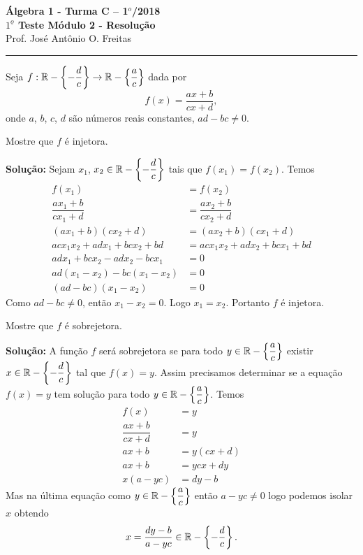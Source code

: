 \documentclass[12pt]{article}
\begin{document}


\begin{center}
{\Large\bf {\'A}lgebra 1 - Turma C -- 1$^{o}$/2018} \\ \vspace{9pt} {\large\bf
  $1^{\underline{o}}$ Teste M\'odulo 2 - Resolu\c{c}\~ao}\\
\vspace{9pt} Prof. Jos{\'e} Ant{\^o}nio O. Freitas
\end{center}
\hrule

\vspace{.6cm}

Seja $f : \mathbb{R} - \left\{-\dfrac{d}{c}\right\} \to \mathbb{R} - \left\{\dfrac{a}{c}\right\}$ dada por
\[
	f(x) =  \dfrac{ax + b}{cx + d},
\]
onde $a$, $b$, $c$, $d$ s{\~a}o n{\'u}meros reais constantes, $ad - bc \ne 0$.
\vspace{.5cm}

\questao Mostre que $f$ \'e injetora.

\noindent\textbf{Solu\c{c}\~ao:} Sejam $x_1$, $x_2 \in \mathbb{R} - \left\{-\dfrac{d}{c}\right\}$ tais que $f(x_1) = f(x_2)$. Temos
\begin{align*}
	f(x_1) &= f(x_2)\\
	\dfrac{ax_1 + b}{cx_1 + d} &= \dfrac{ax_2 + b}{cx_2 + d}\\
	(ax_1 + b)(cx_2 + d) &= (ax_2 + b)(cx_1 + d)\\
	acx_1x_2 + adx_1 + bcx_2 + bd &= acx_1x_2 + adx_2 + bcx_1 + bd\\
	adx_1 + bcx_2 - adx_2 - bcx_1 &= 0\\
	ad(x_1 - x_2) - bc(x_1 - x_2)&= 0\\
	(ad - bc)(x_1 - x_2) &= 0
\end{align*}
Como $ad - bc \ne 0$, ent\~ao $x_1 - x_2 = 0$. Logo $x_1 = x_2$. Portanto $f$ \'e injetora.

\vspace{.5cm}

\questao Mostre que $f$ \'e sobrejetora.

\noindent\textbf{Solu\c{c}\~ao:} A fun\c{c}\~ao $f$ ser\'a sobrejetora se para todo $y \in \mathbb{R} - \left\{\dfrac{a}{c}\right\}$ existir $x \in \mathbb{R} - \left\{-\dfrac{d}{c}\right\}$ tal que $f(x) = y$. Assim precisamos determinar se a equa\c{c}\~ao $f(x) = y$ tem solu\c{c}\~ao para todo $y \in \mathbb{R} - \left\{\dfrac{a}{c}\right\}$.
Temos
\begin{align*}
	f(x) &= y\\
	\dfrac{ax + b}{cx + d} &= y\\
	ax + b &= y(cx + d)\\
	ax + b &= ycx + dy\\
	x(a - yc) &= dy - b
\end{align*}
Mas na \'ultima equa\c{c}\~ao como $y \in \mathbb{R} - \left\{\dfrac{a}{c}\right\}$ ent\~ao $a - yc \ne 0$ logo podemos isolar $x$ obtendo
\[
	x = \dfrac{dy - b}{a - yc} \in \mathbb{R} - \left\{-\dfrac{d}{c}\right\}.
\]
\end{document}

